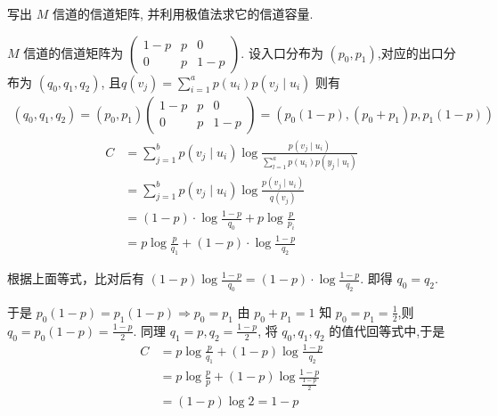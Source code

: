 \newpage
\begin{tcolorbox}[breakable,colback=blue!5!white,colframe=blue!75!black,
 title= 解答题]

写出 $ M $ 信道的信道矩阵, 并利用极值法求它的信道容量.
\tcblower

   $ M $ 信道的信道矩阵为 $ \left(\begin{array}{ccc}1-p & p & 0 \\ 0 & p & 1-p\end{array}\right) $.
设入口分布为 $ \left(p_{0}, p_{1}\right) $,对应的出口分布为 $ \left(q_{0}, q_{1}, q_{2}\right)$, 且$q\left(v_{j}\right)=\sum\limits_{i=1}^{a} p\left(u_{i}\right) {p}\left(v_{j} \mid u_{i}\right) $
则有
$$
\begin{array}{c}
\left(q_{0}, q_{1}, q_{2}\right)=\left(p_{0}, p_{1}\right)\left(\begin{array}{ccc}
1-p & p & 0 \\
0 & p & 1-p
\end{array}\right)=\left(p_{0}(1-p),\left(p_{0}+p_{1}\right) p, p_{1}(1-p)\right)
\end{array}
$$
$$
\begin{aligned}
C& =\sum_{j=1}^{b} p\left(v_{j} \mid u_{i}\right) \log \frac{p\left(v_{j} \mid u_{i}\right)}{\sum\limits_{l=1}^{a} p\left(u_{i}\right) p\left(y_{j} \mid u_{l}\right)} \\
& =\sum_{j=1}^{b} p\left(v_{j} \mid u_{i}\right) \log \frac{p\left(v_{j} \mid u_{i}\right)}{q\left(v_{j}\right)} \\
& =(1-p) \cdot \log \frac{1-p}{q_{0}}+p\log \frac{p}{p_{i}} \\
& =p \log \frac{p}{q_{1}}+(1-p) \cdot \log \frac{1-p}{q_{2}}
\end{aligned}
$$

根据上面等式，比对后有 $ (1-p) \log \frac{1-p}{q_{0}}=(1-p) \cdot \log \frac{1-p}{q_{2}} $.
即得 $ q_{0}=q_{2} $.

于是 $ p_{0}(1-p)=p_{1}(1-p) \Rightarrow p_{0}=p_{1} $
由 $ p_{0}+p_{1}=1 $ 知 $ p_{0}=p_{1}=\frac{1}{2}$,则$q_{0}=p_{0}(1-p)=\frac{1-p}{2} $.
同理 $ q_{1}=p, q_{2}=\frac{1-p}{2} $, 将 $ q_{0}, q_{1}, q_{2} $ 的值代回等式中,于是 
$$
\begin{aligned}
 C&=p \log \frac{p}{q_{1}}+(1-p) \log \frac{1-p}{q_{2}} \\
&=p \log \frac{p}{p}+(1-p) \log \frac{1-p}{\frac{1-p}{2}} \\
&=(1-p) \log 2=1-p
\end{aligned}
$$
    
\end{tcolorbox}


